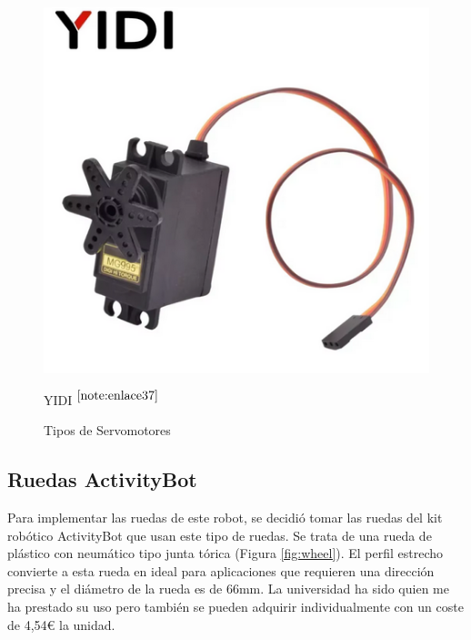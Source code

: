 \begin{figure}[ht!]
\begin{minipage}{0.33\linewidth}
		\includegraphics[width=\linewidth]{figs/diyi.png}
		\caption*{\centering YIDI $^{\ref{note:enlace37}}$} %
	\end{minipage}
	\caption{Tipos de Servomotores}
	\label{fig:parallax}
\end{figure}


\setcounter{footnote}{36} %

\setcounter{footnote}{37} %


\subsection{Ruedas ActivityBot}

Para implementar las ruedas de este robot, se decidió tomar las ruedas del kit robótico ActivityBot que usan este tipo de ruedas. Se trata de una rueda de plástico con neumático tipo junta tórica (Figura \ref{fig:wheel}). El perfil estrecho convierte a esta rueda en ideal para aplicaciones que requieren una dirección precisa y el diámetro de la rueda es de 66mm. La universidad ha sido quien me ha prestado su uso pero también se pueden adquirir individualmente con un coste de 4,54€ la unidad.

